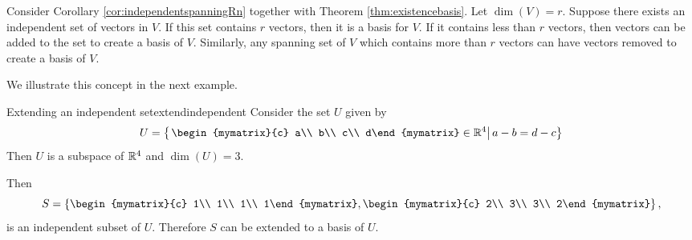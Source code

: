 Consider Corollary \ref{cor:independentspanningRn} together with Theorem \ref{thm:existencebasis}. Let $\dim(V) = r$. Suppose there exists an independent set of vectors in $V$. If this set contains $r$ vectors, then it is a basis for $V$. If it contains less than $r$ vectors, then vectors can be added to the set to create a basis of $V$. Similarly, any spanning set of $V$ which contains more than $r$ vectors can have vectors removed to create a basis of $V$.

We illustrate this concept in the next example.

\begin{example}{Extending an independent set}{extendindependent}
Consider the set $U$ given by 
\[ U=\set{\left.\begin{mymatrix}{c} a\\ b\\ c\\ d\end{mymatrix}
\in\R^4 \right\vert a-b=d-c }\]
Then $U$ is a subspace of $\mathbb{R}^4$ and $\dim(U)=3$.

Then
\[S=\set{
\begin{mymatrix}{c} 1\\ 1\\ 1\\ 1\end{mymatrix},
\begin{mymatrix}{c} 2\\ 3\\ 3\\ 2\end{mymatrix} },\]
is an independent subset of $U$.
Therefore $S$ can be extended to a basis of $U$.
\end{example}

